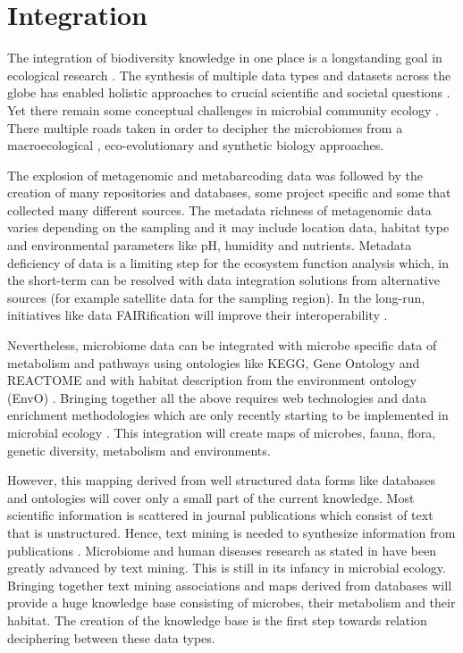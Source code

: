 \section{Integration}
\label{sec:integration}

The integration of biodiversity knowledge in one place is a longstanding
goal in ecological research \parencite{Walter_2012}. The synthesis of multiple
data types and datasets across the globe has enabled 
holistic approaches to crucial scientific and societal questions \parencite{heberling_j_mason_data_2021}.
Yet there remain some conceptual challenges in microbial community ecology \parencite{prosser2020Conceptual}.
There multiple roads taken in order to decipher the microbiomes from a macroecological \parencite{Mascarenhas2020}, 
eco-evolutionary \parencite{martiny2023Investigating, loreau2023Opportunities} and synthetic biology \parencite{Leggieri2021} approaches.

The explosion of metagenomic and metabarcoding data was followed by the creation
of many repositories and databases, some project specific and some that
collected many different sources. The metadata richness of metagenomic data
varies depending on the sampling and it may include location data, habitat type
and environmental parameters like pH, humidity and nutrients. Metadata
deficiency of data is a limiting step for the ecosystem function analysis
which, in the short-term can be resolved with data integration solutions from
alternative sources (for example satellite data for the sampling region). In
the long-run, initiatives like data FAIRification will improve their
interoperability \parencite{wilkinson2016the-fair}.



Nevertheless, microbiome data can be integrated with microbe
specific data of metabolism and pathways using ontologies like KEGG, Gene
Ontology and REACTOME and with habitat description from the environment
ontology (EnvO) \parencite{buttigieg2016environment}. Bringing together all the above requires web technologies and
data enrichment methodologies which are only recently starting to be
implemented in microbial ecology \parencite{jiang2016Microbiome}. This integration
will create maps of microbes, fauna, flora, genetic diversity, metabolism and environments. 

However, this mapping derived from well structured data forms like databases
and ontologies will cover only a small part of the current knowledge. Most
scientific information is scattered in journal publications which consist of
text that is unstructured. Hence, text mining is needed to synthesize
information from publications \parencite{jensen2006Literature}. Microbiome and
human diseases research as stated in \parencite{badal2019Challenges} have been
greatly advanced by text mining. This is still in its infancy in microbial
ecology. Bringing together text mining associations and maps derived from
databases will provide a huge knowledge base consisting of microbes, their
metabolism and their habitat. The creation of the knowledge base is the first
step towards relation deciphering between these data types.

